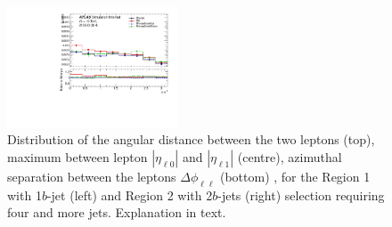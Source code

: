 \begin{figure}[!htb]
\includegraphics[width=0.45\textwidth]{Plots/ttV/c_Region_1_lep_dPhi} 
  \caption{Distribution of the angular distance between the two leptons (top), maximum between lepton $|\eta_{\ell 0}|$ and $|\eta_{\ell 1}|$ (centre), azimuthal separation between the leptons $\Delta \phi _{\ell \ell }$ (bottom) , for the Region 1 with 1$b$-jet (left) and Region 2 with 2$b$-jets (right) selection requiring four and more jets. Explanation in text.
   \label{ttV:ll_kin}}
\end{figure}
% 



